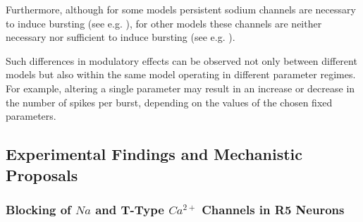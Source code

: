 \documentclass[../main.tex]{subfiles}
\begin{document}
Furthermore, although for some models persistent sodium channels are necessary to induce bursting (see e.g. \cite{liuMultipleConductancesCooperatively2008,wangMultipleDynamicalModes1994}), for other models these channels are neither necessary nor sufficient to induce bursting (see e.g. \cite{golombContributionPersistentNa2006}).

Such differences in modulatory effects can be observed not only between different models but also within the same model operating in different parameter regimes. For example, altering a single parameter may result in an increase or decrease in the number of spikes per burst, depending on the values of the chosen fixed parameters.










\subsection{Experimental Findings and Mechanistic Proposals}

\subsubsection{\texorpdfstring{Blocking of $Na$ and T-Type $Ca^{2+}$ Channels in R5 Neurons}{Blocking of Na and T-Type Ca2+ Channels in R5 Neurons}}
\end{document}
